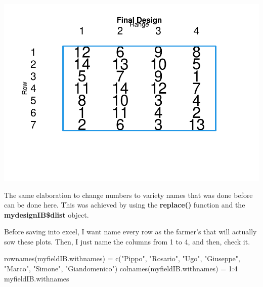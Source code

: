 \documentclass[
]{book}
\newenvironment{Shaded}{\begin{snugshade}}{\end{snugshade}}
\newcommand{\AttributeTok}[1]{\textcolor[rgb]{0.77,0.63,0.00}{#1}}
\newcommand{\CommentTok}[1]{\textcolor[rgb]{0.56,0.35,0.01}{\textit{#1}}}
\newcommand{\DecValTok}[1]{\textcolor[rgb]{0.00,0.00,0.81}{#1}}
\newcommand{\FunctionTok}[1]{\textcolor[rgb]{0.00,0.00,0.00}{#1}}
\newcommand{\NormalTok}[1]{#1}
\newcommand{\OtherTok}[1]{\textcolor[rgb]{0.56,0.35,0.01}{#1}}
\newcommand{\SpecialCharTok}[1]{\textcolor[rgb]{0.00,0.00,0.00}{#1}}
\newcommand{\StringTok}[1]{\textcolor[rgb]{0.31,0.60,0.02}{#1}}
\begin{document}
\includegraphics{PPB-Toolkit-for-R-and-R-Studio_files/figure-latex/unnamed-chunk-90-1.pdf}

The same elaboration to change numbers to variety names that was done before can be done here. This was achieved by using the \textbf{replace()} function and the \textbf{mydesignIB\$dlist} object.

\begin{Shaded}
\end{Shaded}

Before saving into excel, I want name every row as the farmer's that will actually sow these plots. Then, I just name the columns from 1 to 4, and then, check it.

\begin{Shaded}
\begin{Highlighting}[]
\FunctionTok{rownames}\NormalTok{(myfieldIB.withnames) }\OtherTok{=} \FunctionTok{c}\NormalTok{(}\StringTok{"Pippo"}\NormalTok{, }\StringTok{"Rosario"}\NormalTok{, }\StringTok{"Ugo"}\NormalTok{, }\StringTok{"Giuseppe"}\NormalTok{, }\StringTok{"Marco"}\NormalTok{, }\StringTok{"Simone"}\NormalTok{, }\StringTok{"Giandomenico"}\NormalTok{)}
\FunctionTok{colnames}\NormalTok{(myfieldIB.withnames) }\OtherTok{=} \DecValTok{1}\SpecialCharTok{:}\DecValTok{4}
\NormalTok{myfieldIB.withnames}
\end{Highlighting}
\end{Shaded}
\end{document}
